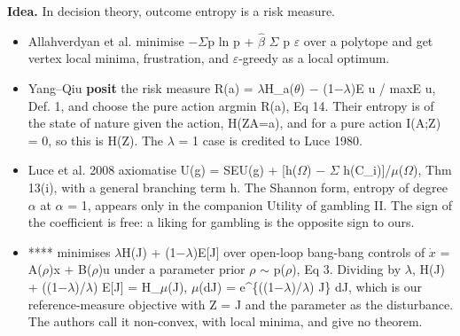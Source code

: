 \documentclass[10pt]{article}
\begin{document}
\textbf{Idea.} In decision theory, outcome entropy is a risk measure.
\begin{itemize}[nosep,leftmargin=1.2em]
\item Allahverdyan et al. minimise \ensuremath{-}\ensuremath{\Sigma}p ln p + \ensuremath{\hat{\beta}} \ensuremath{\Sigma} p \ensuremath{\varepsilon} over a polytope and get vertex local minima, frustration, and \ensuremath{\varepsilon}-greedy as a local optimum.
\item Yang--Qiu \textbf{posit} the risk measure R(a) = \ensuremath{\lambda}H\_a(\ensuremath{\theta}) \ensuremath{-} (1\ensuremath{-}\ensuremath{\lambda})E u / max\textbar{}E u\textbar{}, Def. 1, and choose the pure action argmin R(a), Eq 14. Their entropy is of the state of nature given the action, H(Z\textbar{}A=a), and for a pure action I(A;Z) = 0, so this is H(Z). The \ensuremath{\lambda} = 1 case is credited to Luce 1980.
\item Luce et al. 2008 axiomatise U(g) = SEU(g) + [h(\ensuremath{\Omega}) \ensuremath{-} \ensuremath{\Sigma} h(C\_i)]/\ensuremath{\mu}(\ensuremath{\Omega}), Thm 13(i), with a general branching term h. The Shannon form, entropy of degree \ensuremath{\alpha} at \ensuremath{\alpha} = 1, appears only in the companion Utility of gambling II. The sign of the coefficient is free: a liking for gambling is the opposite sign to ours.
\item **\citet{Adurthi-minimum14}** minimises \ensuremath{\lambda}H(J) + (1\ensuremath{-}\ensuremath{\lambda})E[J] over open-loop bang-bang controls of \ensuremath{\dot{x}} = A(\ensuremath{\rho})x + B(\ensuremath{\rho})u under a parameter prior \ensuremath{\rho} \ensuremath{\sim} p(\ensuremath{\rho}), Eq 3. Dividing by \ensuremath{\lambda}, H(J) + ((1\ensuremath{-}\ensuremath{\lambda})/\ensuremath{\lambda}) E[J] = H\_\ensuremath{\mu}(J),  \ensuremath{\mu}(dJ) = e\^{}\{((1\ensuremath{-}\ensuremath{\lambda})/\ensuremath{\lambda}) J\} dJ, which is our reference-measure objective with Z = J and the parameter as the disturbance. The authors call it non-convex, with local minima, and give no theorem.
\end{itemize}
\end{document}
